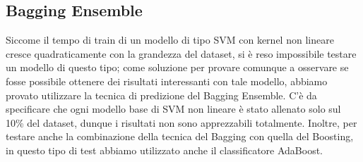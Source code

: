 \subsection{Bagging Ensemble}
Siccome il tempo di train di un modello di tipo SVM con kernel non lineare cresce quadraticamente con la grandezza del dataset, si è reso impossibile testare un modello di questo tipo; come soluzione per provare comunque a osservare se fosse possibile ottenere dei risultati interessanti con tale modello, abbiamo provato utilizzare la tecnica di predizione del Bagging Ensemble.
C'è da specificare che ogni modello base di SVM non lineare è stato allenato solo sul 10\% del dataset, dunque i risultati non sono apprezzabili totalmente.
Inoltre, per testare anche la combinazione della tecnica del Bagging con quella del Boosting, in questo tipo di test abbiamo utilizzato anche il classificatore AdaBoost.

